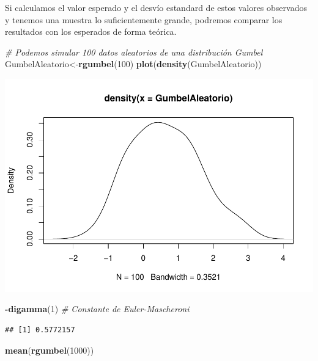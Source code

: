 \documentclass[
  oneside]{book}
\newenvironment{Shaded}{\begin{snugshade}}{\end{snugshade}}
\newcommand{\CommentTok}[1]{\textcolor[rgb]{0.56,0.35,0.01}{\textit{#1}}}
\newcommand{\DecValTok}[1]{\textcolor[rgb]{0.00,0.00,0.81}{#1}}
\newcommand{\FunctionTok}[1]{\textcolor[rgb]{0.13,0.29,0.53}{\textbf{#1}}}
\newcommand{\NormalTok}[1]{#1}
\newcommand{\OtherTok}[1]{\textcolor[rgb]{0.56,0.35,0.01}{#1}}
\newcommand{\SpecialCharTok}[1]{\textcolor[rgb]{0.81,0.36,0.00}{\textbf{#1}}}
\begin{document}
Si calculamos el valor esperado y el desvío estandard de estos valores
observados y tenemos una muestra lo suficientemente grande, podremos
comparar los resultados con los esperados de forma teórica.

\begin{Shaded}
\begin{Highlighting}[]
\CommentTok{\# Podemos simular 100 datos aleatorios de una distribución Gumbel}
\NormalTok{GumbelAleatorio}\OtherTok{\textless{}{-}}\FunctionTok{rgumbel}\NormalTok{(}\DecValTok{100}\NormalTok{)}
\FunctionTok{plot}\NormalTok{(}\FunctionTok{density}\NormalTok{(GumbelAleatorio))}
\end{Highlighting}
\end{Shaded}

\includegraphics{extremales_files/figure-latex/unnamed-chunk-4-1.pdf}

\begin{Shaded}
\begin{Highlighting}[]
\SpecialCharTok{{-}}\FunctionTok{digamma}\NormalTok{(}\DecValTok{1}\NormalTok{) }\CommentTok{\# Constante de Euler{-}Mascheroni}
\end{Highlighting}
\end{Shaded}

\begin{verbatim}
## [1] 0.5772157
\end{verbatim}

\begin{Shaded}
\begin{Highlighting}[]
\FunctionTok{mean}\NormalTok{(}\FunctionTok{rgumbel}\NormalTok{(}\DecValTok{1000}\NormalTok{))}
\end{Highlighting}
\end{Shaded}
\end{document}

